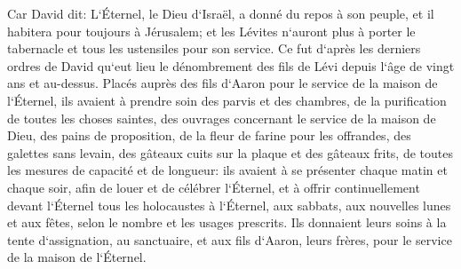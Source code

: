 \verse Car David dit: L`Éternel, le Dieu d`Israël, a donné du repos à son peuple, et il habitera pour toujours à Jérusalem; 
\verse et les Lévites n`auront plus à porter le tabernacle et tous les ustensiles pour son service. 
\verse Ce fut d`après les derniers ordres de David qu`eut lieu le dénombrement des fils de Lévi depuis l`âge de vingt ans et au-dessus. 
\verse Placés auprès des fils d`Aaron pour le service de la maison de l`Éternel, ils avaient à prendre soin des parvis et des chambres, de la purification de toutes les choses saintes, des ouvrages concernant le service de la maison de Dieu, 
\verse des pains de proposition, de la fleur de farine pour les offrandes, des galettes sans levain, des gâteaux cuits sur la plaque et des gâteaux frits, de toutes les mesures de capacité et de longueur: 
\verse ils avaient à se présenter chaque matin et chaque soir, afin de louer et de célébrer l`Éternel, 
\verse et à offrir continuellement devant l`Éternel tous les holocaustes à l`Éternel, aux sabbats, aux nouvelles lunes et aux fêtes, selon le nombre et les usages prescrits. 
\verse Ils donnaient leurs soins à la tente d`assignation, au sanctuaire, et aux fils d`Aaron, leurs frères, pour le service de la maison de l`Éternel. 

